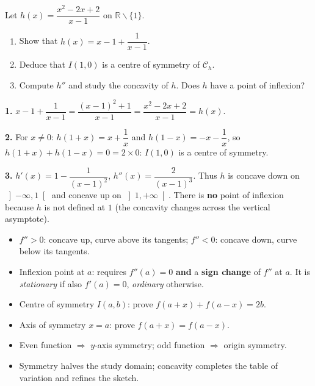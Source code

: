 \documentclass[11pt]{article}
\def\setminus{\mathbin{\backslash}}\let\smallsetminus\setminus
\begin{document}
\begin{exercice}
Let $h(x) = \dfrac{x^2 - 2x + 2}{x - 1}$ on $\mathbb{R}\setminus\{1\}$.
\begin{enumerate}
\item Show that $h(x) = x - 1 + \dfrac{1}{x-1}$.
\item Deduce that $I(1,0)$ is a centre of symmetry of $\mathcal{C}_h$.
\item Compute $h''$ and study the concavity of $h$. Does $h$ have a point of inflexion?
\end{enumerate}
\end{exercice}

\begin{corrige}[Exercise 2]
\textbf{1.} $x - 1 + \dfrac{1}{x-1} = \dfrac{(x-1)^2 + 1}{x-1} = \dfrac{x^2 - 2x + 2}{x-1} = h(x)$.

\textbf{2.} For $x \neq 0$: $h(1+x) = x + \dfrac{1}{x}$ and $h(1-x) = -x - \dfrac{1}{x}$, so $h(1+x) + h(1-x) = 0 = 2 \times 0$: $I(1,0)$ is a centre of symmetry.

\textbf{3.} $h'(x) = 1 - \dfrac{1}{(x-1)^2}$, $h''(x) = \dfrac{2}{(x-1)^3}$. Thus $h$ is concave down on $\left]-\infty,1\right[$ and concave up on $\left]1,+\infty\right[$. There is \textbf{no} point of inflexion because $h$ is not defined at $1$ (the concavity changes across the vertical asymptote).
\end{corrige}

\begin{aretenir}
\begin{itemize}
\item $f'' > 0$: concave up, curve above its tangents; $f'' < 0$: concave down, curve below its tangents.
\item Inflexion point at $a$: requires $f''(a) = 0$ \textbf{and} a \textbf{sign change} of $f''$ at $a$. It is \emph{stationary} if also $f'(a)=0$, \emph{ordinary} otherwise.
\item Centre of symmetry $I(a,b)$: prove $f(a+x) + f(a-x) = 2b$.
\item Axis of symmetry $x = a$: prove $f(a+x) = f(a-x)$.
\item Even function $\Rightarrow$ $y$-axis symmetry; odd function $\Rightarrow$ origin symmetry.
\item Symmetry halves the study domain; concavity completes the table of variation and refines the sketch.
\end{itemize}
\end{aretenir}
\end{document}
